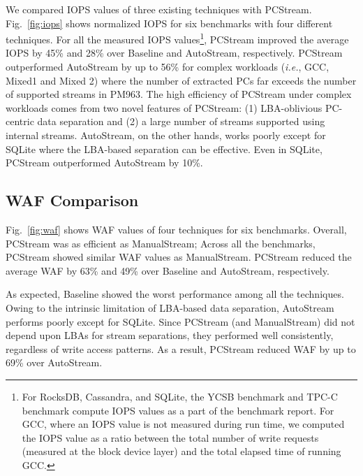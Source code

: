 We compared IOPS values of three existing techniques with \textsf{\small
PCStream}.  Fig.~\ref{fig:iops} shows normalized IOPS for six benchmarks with
four different techniques. For all the measured IOPS values\footnote{ For
RocksDB, Cassandra, and SQLite, the YCSB benchmark and TPC-C benchmark compute
IOPS values as a part of the benchmark report.  For GCC,
where an IOPS value is not measured during run time, 
we computed the IOPS value as a ratio between the total number of write requests
(measured at the block device layer) and the total elapsed time of running GCC.},
\textsf{\small PCStream} improved the average IOPS by 45\% and 28\% over 
\textsf{\small Baseline} and \textsf{\small AutoStream}, respectively.
\textsf{\small PCStream} outperformed \textsf{\small AutoStream}
by up to 56\% for complex workloads ({\it i.e.}, GCC, Mixed1 and Mixed 2) where
the number of extracted PCs far exceeds the number of supported streams
in PM963. The high efficiency of \textsf{\small PCStream} under complex
workloads comes from two novel features of \textsf{\small PCStream}: (1) LBA-oblivious 
PC-centric data separation and (2) a large number of streams supported 
using internal streams. \textsf{\small AutoStream}, on the other hands,
works poorly except for SQLite where the LBA-based separation
can be effective.
Even in SQLite, \textsf{\small PCStream} outperformed \textsf{\small AutoStream}
by 10\%.

\subsection{WAF Comparison}

Fig.~\ref{fig:waf} shows WAF values of four techniques for six benchmarks.
Overall, \textsf{\small PCStream} was as efficient as \textsf{\small
ManualStream}; Across all the benchmarks, \textsf{\small PCStream} showed 
similar WAF values as \textsf{\small ManualStream}. \textsf{\small PCStream}
reduced the average WAF by 63\% and 49\% over \textsf{\small Baseline} and
\textsf{\small AutoStream}, respectively.  

As expected, \textsf{\small Baseline} showed the worst performance among all
the techniques. Owing to the intrinsic limitation of LBA-based data
separation, \textsf{\small AutoStream} performs poorly except for
SQLite.  Since \textsf{\small PCStream} (and \textsf{\small ManualStream}) did
not depend upon LBAs for stream separations, they performed well consistently,
regardless of write access patterns. As a result, \textsf{\small PCStream}
reduced WAF by up to 69\% over \textsf{\small AutoStream}.

